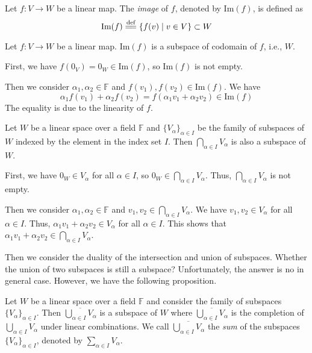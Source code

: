 \documentclass[
	11pt, %
	fleqn, %
	a4paper, %
]{LegrandOrangeBook}
\renewcommand{\Im}[1]{\text{Im}(#1)} %
\renewcommand{\bar}[1]{\overline{#1}} %
\newcommand{\F}{\mathbb{F}} %
\begin{document}
\begin{definition}[Images]
    Let $f : V \to W$ be a linear map. The \emph{image} of $f$, denoted by $\Im f$, is defined as 
    \[
        \Im f \overset{\text{def}}{=\joinrel=} \{ f(v) \mid v \in V \} \subset W
    \]
\end{definition}

\begin{example}
    Let $f : V \to W$ be a linear map. $\Im f$ is a subspace of codomain of $f$, i.e., $W$.

    First, we have $f(0_V) = 0_W \in \Im f$, so $\Im f$ is not empty.

    Then we consider $\alpha_1, \alpha_2 \in \F$ and $f(v_1), f(v_2) \in \Im f$. We have 
    \[
        \alpha_1 f(v_1) + \alpha_2 f(v_2) = f(\alpha_1 v_1 + \alpha_2 v_2) \in \Im f
    \]
    The equality is due to the linearity of $f$.
\end{example}

\begin{example}
    Let $W$ be a linear space over a field $\F$ and $\{V_\alpha\}_{\alpha \in I}$ be the family of subspaces of $W$ indexed by the element in the index set $I$. Then $\bigcap_{\alpha \in I} V_\alpha$ is also a subspace of $W$.

    First, we have $0_W \in V_\alpha$ for all $\alpha \in I$, so $0_W \in \bigcap_{\alpha \in I} V_\alpha$. Thus, $\bigcap_{\alpha \in I} V_\alpha$ is not empty.

    Then we consider $\alpha_1, \alpha_2 \in \F$ and $v_1, v_2 \in \bigcap_{\alpha \in I} V_\alpha$. We have $v_1, v_2 \in V_\alpha$ for all $\alpha \in I$. Thus, $\alpha_1 v_1 + \alpha_2 v_2 \in V_\alpha$ for all $\alpha \in I$. This shows that $\alpha_1 v_1 + \alpha_2 v_2 \in \bigcap_{\alpha \in I} V_\alpha$.
\end{example}

Then we consider the duality of the intersection and union of subspaces. Whether the union of two subspaces is still a subspace? Unfortunately, the answer is no in general case. However, we have the following proposition.

\begin{proposition}
    Let $W$ be a linear space over a field $\F$ and consider the family of subspaces $\{V_\alpha\}_{\alpha \in I}$. Then $\bar{\bigcup_{\alpha \in I} V_\alpha}$ is a subspace of $W$ where $\bar{\bigcup_{\alpha \in I} V_\alpha}$ is the completion of $\bigcup_{\alpha \in I} V_\alpha$ under linear combinations. We call $\bar{\bigcup_{\alpha \in I} V_\alpha}$ the \emph{sum} of the subspaces $\{V_\alpha\}_{\alpha \in I}$, denoted by $\sum_{\alpha \in I} V_\alpha$.
\end{proposition}
\end{document}
